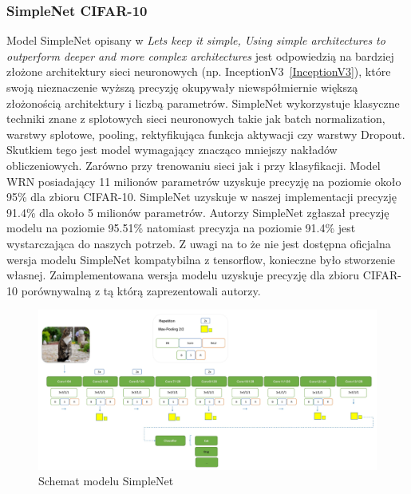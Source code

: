 \documentclass[
    left=2.5cm,         %
    right=2.5cm,        %
    top=2.5cm,          %
    bottom=3cm,         %
    bindingoffset=6mm,  %
    nohyphenation=false %
]{eiti/eiti-thesis}
\begin{document}
        \subsubsection{SimpleNet CIFAR-10}\label{SimpleNetCIFAR-10}
        Model SimpleNet opisany w
        \textit{Lets keep it simple, Using simple architectures to outperform deeper and more complex architectures}\cite{DBLP:journals/corr/HasanPourRVS16}
        jest odpowiedzią na bardziej złożone
        architektury sieci neuronowych (np. InceptionV3~\ref{InceptionV3}), które swoją nieznaczenie wyższą precyzję
        okupywały niewspółmiernie większą złożonością architektury i liczbą parametrów. SimpleNet wykorzystuje klasyczne
        techniki znane z splotowych sieci neuronowych takie jak batch normalization, warstwy splotowe, pooling,
        rektyfikująca funkcja aktywacji czy warstwy Dropout. Skutkiem tego jest model wymagający znacząco mniejszy nakładów
        obliczeniowych. Zarówno przy trenowaniu sieci jak i przy klasyfikacji. Model WRN\cite{DBLP:journals/corr/ZagoruykoK16}
        posiadający 11 milionów parametrów uzyskuje precyzję na poziomie około 95\% dla zbioru CIFAR-10.
        SimpleNet uzyskuje w naszej implementacji precyzję 91.4\% dla około 5 milionów parametrów.
        Autorzy SimpleNet zgłaszał precyzję modelu na poziomie 95.51\% natomiast precyzja na poziomie 91.4\% jest wystarczająca do naszych potrzeb.
        Z uwagi na to że nie jest dostępna oficjalna wersja modelu SimpleNet kompatybilna z tensorflow, konieczne było stworzenie własnej.
        Zaimplementowana wersja modelu uzyskuje precyzję dla zbioru CIFAR-10 porównywalną z tą którą zaprezentowali autorzy.
        \begin{figure}[H]
            \centring
            \includegraphics[width=\textwidth]{eiti/simplenet_overview.jpg}
            \caption{Schemat modelu SimpleNet\cite{DBLP:journals/corr/HasanPourRVS16}}
        \end{figure}
\end{document}
